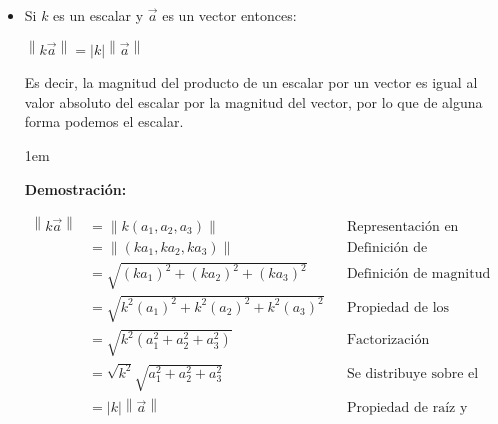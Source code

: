 \documentclass[12pt, fleqn]{report}                             %
\newenvironment{SmallIndentation}[1][0.75em]                    %
        {\begin{adjustwidth}{#1}{}\begin{footnotesize}}             %
        {\end{footnotesize}\end{adjustwidth}}                       %
\newcommand \Quote {\qq}                                        %
\theoremstyle{break}                                            %
\newcommand{\abs}[1]{\left\lvert #1 \right\lvert}               %
\newcommand{\Abs}[1]{\left\lVert #1 \right\lVert}               %
\begin{document}
                \begin{itemize}
                    
                    \item Si $k$ es un escalar y $\vec{a}$ es un vector entonces:
                    
                        $\Abs{k\vec{a}} = \abs{k} \Abs{\vec{a}}$
                        
                        Es decir, la magnitud del producto de un escalar por un vector es
                        igual al valor absoluto del escalar por la magnitud del vector,
                        por lo que de alguna forma podemos \Quote{sacar} el escalar.
                            
                        \begin{SmallIndentation}[1em]
                            \textbf{Demostración:}

                            \begin{align*}
                                \Abs{k\vec{a}}
                                    &= \Abs{k(a_1, a_2, a_3)}                       &&\mbox{Representación en Coordenadas}             \\
                                    &= \Abs{(ka_1, ka_2, ka_3)}                     &&\mbox{Definición de multiplicación por escalar}  \\
                                    &= \sqrt{(ka_1)^2 + (ka_2)^2 + (ka_3)^2}        &&\mbox{Definición de magnitud}                    \\
                                    &= \sqrt{k^2(a_1)^2 + k^2(a_2)^2 + k^2(a_3)^2}  &&\mbox{Propiedad de los exponentes en los reales} \\
                                    &= \sqrt{k^2(a_1^2 + a_2^2 + a_3^2)}            &&\mbox{Factorización}                             \\
                                    &= \sqrt{k^2}\sqrt{a_1^2 + a_2^2 + a_3^2}       &&\mbox{Se distribuye sobre el producto de reales} \\
                                    &= \abs{k} \Abs{\vec{a}}                        &&\mbox{Propiedad de raíz y definición de magnitud}
                            \end{align*}

                        \end{SmallIndentation}

                \end{itemize}
\end{document}
